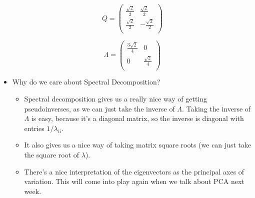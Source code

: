 \documentclass[12pt]{article}
\begin{document}
\begin{itemize}
	\begin{equation*}
	Q = \left( 
	\begin{array}{cc}
	\frac{\sqrt{2}}{2} & \frac{\sqrt{2}}{2} \\
	\frac{\sqrt{2}}{2} & -\frac{\sqrt{2}}{2} \\
	\end{array} 
	\right)
	\end{equation*}
	
	\begin{equation*}
	\Lambda = \left( 
	\begin{array}{cc}
	\frac{3 \sqrt{2}}{4} & 0 \\
	0 & \frac{\sqrt{2}}{4} \\
	\end{array} 
	\right)
	\end{equation*}
	
	\item Why do we care about Spectral Decomposition?
	\begin{itemize}
		\item Spectral decomposition gives us a really nice way of getting pseudoinverses, as we can just take the inverse of $\Lambda$. Taking the inverse of $\Lambda$ is easy, because it's a diagonal matrix, so the inverse is diagonal with entries $1/\lambda_{ii}$.
		\item It also gives us a nice way of taking matrix square roots (we can just take the square root of $\lambda$).
		\item There's a nice interpretation of the eigenvectors as the principal axes of variation. This will come into play again when we talk about PCA next week.
	\end{itemize}
	
	
\end{itemize}
\end{document}
